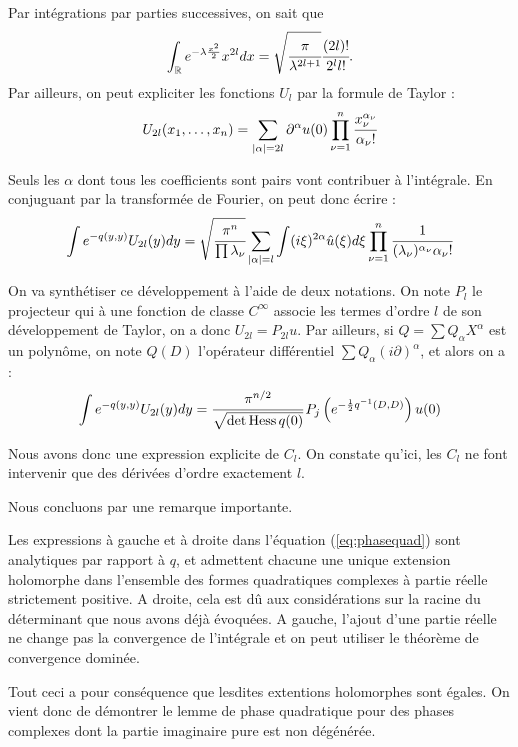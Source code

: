 Par intégrations par parties successives, on sait que 
\begin{equation*}
  \int_{\mathbb{R}} e^{-\lambda \frac{x^2}{2}}x^{2l}dx = \sqrt{\cfrac{\pi}{\lambda^{2l+1}}}\cfrac{(2l)!}{2^l l!}.
\end{equation*}
\noindent Par ailleurs, on peut expliciter les fonctions $U_l$ par la formule de Taylor :
\begin{equation*}
  U_{2l}(x_1,\ldots,x_n) = \sum_{|\alpha|=2l}\partial^{\alpha}u(0)\prod_{\nu=1}^{n}\cfrac{x_{\nu}^{\alpha_{\nu}}}{\alpha_{\nu}!}
\end{equation*}

Seuls les $\alpha$ dont tous les coefficients sont pairs vont contribuer à l'intégrale. En conjuguant par la transformée de Fourier, on peut donc écrire :
\begin{equation*}
  \int e^{-q(y,y)}U_{2l}(y)dy = \sqrt{\cfrac{\pi^n}{\prod \lambda_{\nu}}}\sum_{|\alpha|=l}\int (i\xi)^{2\alpha}\hat{u}(\xi)d\xi \prod_{\nu=1}^{n} \cfrac{1}{(\lambda_{\nu})^{\alpha_{\nu}}\alpha_{\nu}!}
  \end{equation*}
  
On va synthétiser ce développement à l'aide de deux notations. On note $P_l$ le projecteur qui à une fonction de classe $C^{\infty}$ associe les termes d'ordre $l$ de son développement de Taylor, on a donc $U_{2l}=P_{2l}u$. Par ailleurs, si $Q= \sum Q_{\alpha}X^{\alpha}$ est un polynôme, on note $Q(D)$ l'opérateur différentiel $\sum Q_{\alpha}(i\partial)^\alpha$, et alors on a :
\begin{equation}
\label{eq:phasequad}
  \int e^{-q(y,y)}U_{2l}(y)dy =\cfrac{\pi^{n/2}}{\sqrt{\det \operatorname{Hess} q(0)}}\,P_j\left(e^{-\frac{1}{2}q^{-1}(D,D)}\right)u(0)
  \end{equation}

\noindent Nous avons donc une expression explicite de $C_l$. On constate qu'ici, les $C_l$ ne font intervenir que des dérivées d'ordre exactement $l$.

Nous concluons par une remarque importante.

\begin{rem}
Les expressions à gauche et à droite dans l'équation (\ref{eq:phasequad}) sont analytiques par rapport à $q$, et admettent chacune une unique extension holomorphe dans l'ensemble des formes quadratiques complexes à partie réelle strictement positive. A droite, cela est dû aux considérations sur la racine du déterminant que nous avons déjà évoquées. A gauche, l'ajout d'une partie réelle ne change pas la convergence de l'intégrale et on peut utiliser le théorème de convergence dominée.

Tout ceci a pour conséquence que lesdites extentions holomorphes sont égales. On vient donc de démontrer le lemme de phase quadratique pour des phases complexes dont la partie imaginaire pure est non dégénérée.
\end{rem}

